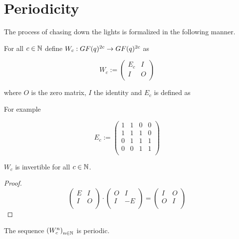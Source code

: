 \section{Periodicity}

The process of chasing down the lights is formalized in the following
manner.

For all $c\in\mathbb{N}$ define $W_{c} : GF(q)^{2c} \rightarrow GF(q)^{2c}$
as

\[
W_{c} := \left(
\begin{array}{cc}
  E_{c} & I \\
  I    & O \\
\end{array}
\right)
\]

where $O$ is the zero matrix, $I$ the identity and $E_{c}$ is defined
as

For example

\[
E_{c} := \left(
\begin{array}{cccc}
  1 & 1 & 0 & 0 \\
  1 & 1 & 1 & 0 \\
  0 & 1 & 1 & 1 \\
  0 & 0 & 1 & 1 \\
\end{array}
\right)
\]

\begin{lemma}
  $W_{c}$ is invertible for all $c\in\mathbb{N}$.
\end{lemma}

\begin{proof}
  \[
  \left(
  \begin{array}{cc}
    E & I \\
    I & O \\
  \end{array}
  \right)
  \cdot
  \left(
  \begin{array}{cc}
    O & I  \\
    I & -E \\
  \end{array}
  \right)
  =
  \left(
  \begin{array}{cc}
    I & O \\
    O & I \\
  \end{array}			
  \right)
  \]
\end{proof}

\begin{theorem}
  The sequence $\left(W_{c}^{n}\right)_{n\in\mathbb{N}}$ is periodic.
\end{theorem}

